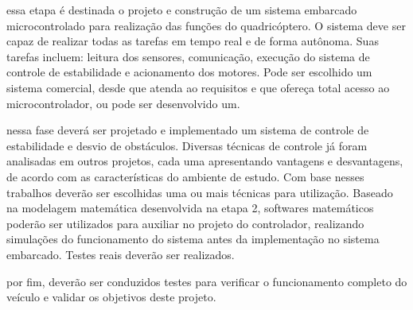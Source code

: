  essa etapa é destinada o projeto e construção de um sistema embarcado microcontrolado para realização das funções do quadricóptero. O sistema deve ser capaz de realizar todas as tarefas em tempo real e de forma autônoma. Suas tarefas incluem: leitura dos sensores, comunicação, execução do sistema de controle de estabilidade e acionamento dos motores. Pode ser escolhido um sistema comercial, desde que atenda ao requisitos e que ofereça total acesso ao microcontrolador, ou pode ser desenvolvido um.


 nessa fase deverá ser projetado e implementado um sistema de controle de estabilidade e desvio de obstáculos. Diversas técnicas de controle já foram analisadas em outros projetos, cada uma apresentando vantagens e desvantagens, de acordo com as características do ambiente de estudo. Com base nesses trabalhos deverão ser escolhidas uma ou mais técnicas para utilização. Baseado na modelagem matemática desenvolvida na etapa 2, softwares matemáticos poderão ser utilizados para auxiliar no projeto do controlador, realizando simulações do funcionamento do sistema antes da implementação no sistema embarcado. Testes reais deverão ser realizados.

 por fim, deverão ser conduzidos testes para verificar o funcionamento completo do veículo e validar os objetivos deste projeto.